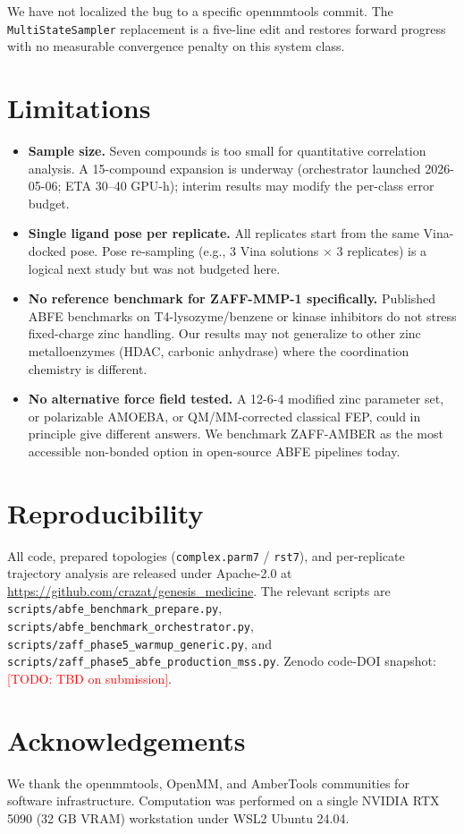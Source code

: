 \documentclass[11pt,a4paper]{article}
\newcommand{\todo}[1]{\textcolor{red}{[TODO: #1]}}
\begin{document}
We have not localized the bug to a specific openmmtools commit.
The \texttt{MultiStateSampler} replacement is a five-line edit and
restores forward progress with no measurable convergence penalty
on this system class.

\section{Limitations}
\label{sec:limitations}

\begin{itemize}[leftmargin=*]
  \item \textbf{Sample size.} Seven compounds is too small for
    quantitative correlation analysis. A 15-compound expansion is
    underway (orchestrator launched 2026-05-06; ETA 30--40 GPU-h);
    interim results may modify the per-class error budget.
  \item \textbf{Single ligand pose per replicate.} All replicates start
    from the same Vina-docked pose. Pose re-sampling
    (e.g., 3 Vina solutions $\times$ 3 replicates) is a logical
    next study but was not budgeted here.
  \item \textbf{No reference benchmark for ZAFF-MMP-1 specifically.}
    Published ABFE benchmarks on T4-lysozyme/benzene
    \citep{mobley2007predictions} or kinase inhibitors do not stress
    fixed-charge zinc handling. Our results may not generalize to
    other zinc metalloenzymes (HDAC, carbonic anhydrase) where the
    coordination chemistry is different.
  \item \textbf{No alternative force field tested.} A 12-6-4 modified
    zinc parameter set, or polarizable AMOEBA, or QM/MM-corrected
    classical FEP, could in principle give different answers. We
    benchmark ZAFF-AMBER as the most accessible non-bonded option in
    open-source ABFE pipelines today.
\end{itemize}

\section{Reproducibility}
\label{sec:reproducibility}

All code, prepared topologies (\texttt{complex.parm7} / \texttt{rst7}),
and per-replicate trajectory analysis are released under Apache-2.0 at
\url{https://github.com/crazat/genesis_medicine}. The relevant scripts
are \texttt{scripts/abfe\_benchmark\_prepare.py},
\texttt{scripts/abfe\_benchmark\_orchestrator.py},
\texttt{scripts/zaff\_phase5\_warmup\_generic.py}, and
\texttt{scripts/zaff\_phase5\_abfe\_production\_mss.py}.
Zenodo code-DOI snapshot: \todo{TBD on submission}.

\section*{Acknowledgements}

We thank the openmmtools, OpenMM, and AmberTools communities for
software infrastructure. Computation was performed on a single
NVIDIA RTX 5090 (32 GB VRAM) workstation under WSL2 Ubuntu 24.04.



\end{document}
